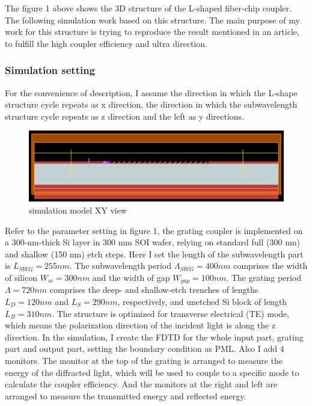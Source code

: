 \documentclass[]{article}
\begin{document}
The figure 1 above shows the 3D structure of the L-shaped fiber-chip coupler. The following simulation work based on this structure. The main purpose of my work for this structure is trying to reproduce the result mentioned in an article, to fulfill the high coupler efficiency and ultra direction. 

\subsubsection{Simulation setting}
For the convenience of description, I assume the direction in which the L-shape structure cycle repeats as x direction, the direction in which the subwavelength structure cycle repeats as z direction and the left as y directions. 

\begin{figure}[H]
	\centering
	\includegraphics[width=0.7\linewidth]{figures/figure2}
	\caption{simulation model XY view}
	\label{fig:figure2}
\end{figure}

Refer to the parameter setting in figure 1, the grating coupler is implemented on a 300-nm-thick Si layer in 300 mm SOI wafer, relying on standard full (300 nm) and shallow (150 nm) etch steps. Here I set the length of the subwavelength part is $L_{SWG} = 255 nm$. The subwavelength period $\Lambda_{SWG} = 400 nm$ comprises the width of silicon $W_{si} = 300 nm$ and the width of gap $W_{gap} = 100nm$. The grating period $\Lambda = 720 nm$ comprises the deep- and shallow-etch trenches of lengths $L_D = 120 nm$ and $L_S = 290 nm$, respectively, and unetched Si block of length $L_B = 310nm$. The structure is optimized for transverse electrical (TE) mode, which means the polarization direction of the incident light is along the z direction. In the simulation, I create the FDTD for the whole input part, grating part and output part, setting the boundary condition as PML. Also I add 4 monitors. The monitor at the top of the grating is arranged to measure the energy of the diffracted light, which will be used to couple to a specific mode to calculate the coupler efficiency. And the monitors at the right and left are arranged to measure the transmitted energy and reflected energy.
\end{document}
